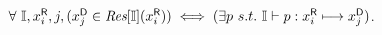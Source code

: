 \documentclass{article}
\begin{document}
\pagestyle{empty}
\noindent
\renewcommand{\S}{\mathcal{S}}
\begin{minipage}{12.3cm}%
$\forall\ \mathbb{I}, {x}^{\mbox{\scriptsize\sf R}}_{i}, j, ({x}^{\mbox{\scriptsize\sf D}}_{j}\in \mbox{\it{Res}}[\mathbb{I}]({x}^{\mbox{\scriptsize\sf R}}_{i})) 
\iff (\exists p\ s.t.\ \mathbb{I} \vdash p : {x}^{\mbox{\scriptsize\sf R}}_{i} \longmapsto {x}^{\mbox{\scriptsize\sf D}}_{j})$.

\end{minipage}%
\end{document}

